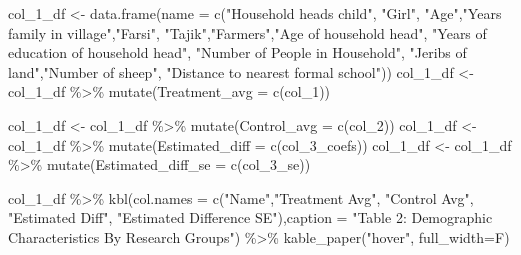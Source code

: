 \documentclass[
]{article}
\newenvironment{Shaded}{\begin{snugshade}}{\end{snugshade}}
\newcommand{\AttributeTok}[1]{\textcolor[rgb]{0.77,0.63,0.00}{#1}}
\newcommand{\FunctionTok}[1]{\textcolor[rgb]{0.00,0.00,0.00}{#1}}
\newcommand{\NormalTok}[1]{#1}
\newcommand{\OtherTok}[1]{\textcolor[rgb]{0.56,0.35,0.01}{#1}}
\newcommand{\SpecialCharTok}[1]{\textcolor[rgb]{0.00,0.00,0.00}{#1}}
\newcommand{\StringTok}[1]{\textcolor[rgb]{0.31,0.60,0.02}{#1}}
\begin{document}
\begin{Shaded}
\begin{Highlighting}[]
\NormalTok{col\_1\_df }\OtherTok{\textless{}{-}} \FunctionTok{data.frame}\NormalTok{(}\AttributeTok{name =} \FunctionTok{c}\NormalTok{(}\StringTok{"Household head\textquotesingle{}s child"}\NormalTok{, }\StringTok{"Girl"}\NormalTok{, }
                               \StringTok{"Age"}\NormalTok{,}\StringTok{"Years family in village"}\NormalTok{,}\StringTok{"Farsi"}\NormalTok{,}
                               \StringTok{"Tajik"}\NormalTok{,}\StringTok{"Farmers"}\NormalTok{,}\StringTok{"Age of household head"}\NormalTok{,}
                               \StringTok{"Years of education of household head"}\NormalTok{, }\StringTok{"Number of People in Household"}\NormalTok{, }
                               \StringTok{"Jeribs of land"}\NormalTok{,}\StringTok{"Number of sheep"}\NormalTok{, }
                               \StringTok{"Distance to nearest formal school"}\NormalTok{))}
\NormalTok{col\_1\_df }\OtherTok{\textless{}{-}}\NormalTok{ col\_1\_df }\SpecialCharTok{\%\textgreater{}\%} \FunctionTok{mutate}\NormalTok{(}\AttributeTok{Treatment\_avg =} \FunctionTok{c}\NormalTok{(col\_1))}

\NormalTok{col\_1\_df }\OtherTok{\textless{}{-}}\NormalTok{ col\_1\_df }\SpecialCharTok{\%\textgreater{}\%} \FunctionTok{mutate}\NormalTok{(}\AttributeTok{Control\_avg =} \FunctionTok{c}\NormalTok{(col\_2))}
\NormalTok{col\_1\_df }\OtherTok{\textless{}{-}}\NormalTok{ col\_1\_df }\SpecialCharTok{\%\textgreater{}\%} \FunctionTok{mutate}\NormalTok{(}\AttributeTok{Estimated\_diff =} \FunctionTok{c}\NormalTok{(col\_3\_coefs))}
\NormalTok{col\_1\_df }\OtherTok{\textless{}{-}}\NormalTok{ col\_1\_df }\SpecialCharTok{\%\textgreater{}\%} \FunctionTok{mutate}\NormalTok{(}\AttributeTok{Estimated\_diff\_se =} \FunctionTok{c}\NormalTok{(col\_3\_se))}


\NormalTok{col\_1\_df }\SpecialCharTok{\%\textgreater{}\%} \FunctionTok{kbl}\NormalTok{(}\AttributeTok{col.names =} \FunctionTok{c}\NormalTok{(}\StringTok{"Name"}\NormalTok{,}\StringTok{"Treatment Avg"}\NormalTok{,}
                               \StringTok{"Control Avg"}\NormalTok{, }\StringTok{"Estimated Diff"}\NormalTok{,}
                               \StringTok{"Estimated Difference SE"}\NormalTok{),}\AttributeTok{caption =} \StringTok{"Table 2: Demographic Characteristics By Research Groups"}\NormalTok{) }\SpecialCharTok{\%\textgreater{}\%} \FunctionTok{kable\_paper}\NormalTok{(}\StringTok{"hover"}\NormalTok{, }\AttributeTok{full\_width=}\NormalTok{F)}
\end{Highlighting}
\end{Shaded}
\end{document}
